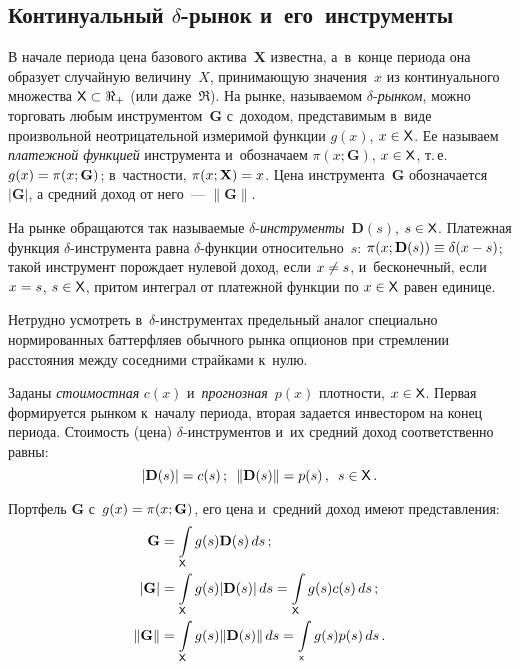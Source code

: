 \begin{multicols}{2}
\vspace*{-4pt}
   
  \section{Континуальный $\delta$-рынок и~его~инструменты}
  
  В начале периода цена базового актива~$\mathbf{X}$ известна, а~в~конце 
периода она образует случайную величину~$X$, принимающую значения~$x$ 
из континуального множества ${\sf X}\subset \Re_+$ (или даже~$\Re$). На 
рынке, называемом $\delta$-\textit{рын\-ком}, можно торговать любым 
инструментом~$\mathbf{G}$ с~доходом, представимым в~виде произвольной 
неотрицательной измеримой функции $g(x)$, $x\hm\in {\sf X}$. Ее называем 
\textit{платежной функцией} инструмента и~обозначаем $\pi (x; \mathbf{G})$, $x\hm\in 
{\sf X}$, т.\,е.\ $g(x)\hm= \pi(x; \mathbf{G})$; в~част\-ности, 
$\pi(x; \mathbf{X})\hm=
x$. 
Цена инструмента~$\mathbf{G}$ обозначается $\vert \mathbf{G}\vert$, а средний доход от него~--- 
$\| \mathbf{G}\|$. 
  
  На рынке обращаются так называемые $\delta$-\textit{ин\-стру\-мен\-ты}~$\mathbf{D}(s)$, 
  $s\hm\in {\sf X}$. Платежная функция $\delta$-ин\-стру\-мен\-та 
равна $\delta$-функ\-ции относительно~$s$: $\pi(x;\mathbf{D}(s))\hm\equiv \delta (x\hm-
s)$; такой инструмент порождает нулевой доход, если $x\hm\not= s$, 
и~бесконечный, если $x\hm=s$, $s\hm\in {\sf X}$, притом интеграл от 
платежной функции по $x\hm\in{\sf X}$ равен единице. 
  
  Нетрудно усмотреть в~$\delta$-ин\-стру\-мен\-тах предельный аналог 
специально нормированных баттерфляев обычного рынка опционов при 
стремлении расстояния между соседними страйками к~нулю. 
  
  Заданы \textit{стоимостная} $c(x)$ и~\textit{прогнозная}~$p(x)$ плотности, 
$x\hm\in {\sf X}$. Первая формируется рынком к~началу периода, вторая 
задается инвестором на конец периода. Стоимость (цена)  
$\delta$-ин\-стру\-мен\-тов и~их средний доход соответственно равны:
  $$
  \vert \mathbf{D}(s)\vert =c(s)\,;\enskip \| \mathbf{D}(s)\|=p(s)\,,\enskip s\in{\sf X}\,.
  $$
  
  Портфель $\mathbf{G}$ с~$g(x)\hm=\pi(x;\mathbf{G})$, его цена и~средний доход имеют 
представления: 
  \begin{align*}
  \mathbf{G}&= \int\limits_{\sf X} g(s) \mathbf{D}(s)\,ds\,;\\
  \vert \mathbf{G}\vert &= \int\limits_{\sf X} g(s) \vert \mathbf{D}(s)\vert\,ds=\int\limits_{\sf X} g(s) 
c(s)\,ds\,;\\
  \| \mathbf{G}\| &= \int\limits_{\sf X} g(s)\| \mathbf{D}(s)\|\,ds= 
  \int\limits_{\sf x} g(s) p(s)\,ds\,.
  \end{align*}
  

\end{multicols}
